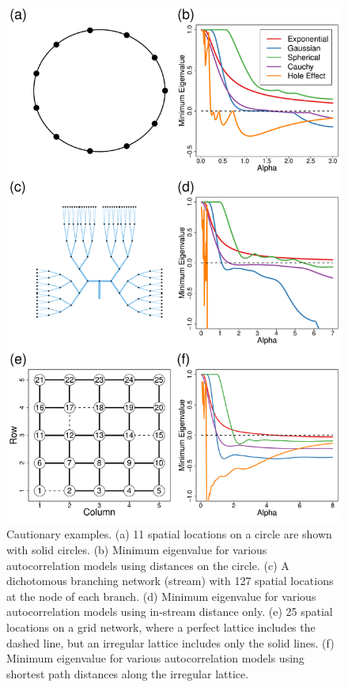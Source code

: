 \documentclass[11pt, titlepage]{article}\usepackage[]{graphicx}\usepackage[]{color}
\begin{document}
\begin{spacing}{1.9}
\begin{flushleft}
\begin{singlespace}
	\begin{figure}[H]
	  \begin{center}
	    \includegraphics[width=.7\linewidth]{figure/CautionEx-1.pdf}
	  \end{center}
	  \caption{Cautionary examples. (a) 11 spatial locations on a circle are shown with solid circles. (b) Minimum eigenvalue for various autocorrelation models using distances on the circle. (c) A dichotomous branching network (stream) with 127 spatial locations at the node of each branch. (d) Minimum eigenvalue for various autocorrelation models using in-stream distance only. (e) 25 spatial locations on a grid network, where a perfect lattice includes the dashed line, but an irregular lattice includes only the solid lines. (f) Minimum eigenvalue for various autocorrelation models using shortest path distances along the irregular lattice. \label{fig:cautionEx}}
  \end{figure}




\end{singlespace}
\end{flushleft}
\end{spacing}
\end{document}
